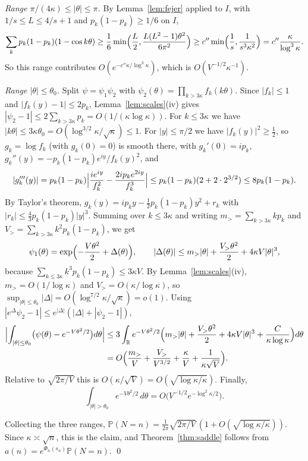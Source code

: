 \documentclass[11pt,a4paper]{article}
\theoremstyle{remark}
\begin{document}
\emph{Range $\pi/(4\kappa)\le|\theta|\le\pi$.} By Lemma~\ref{lem:fejer} applied to $I$, with $1/s\le L\le4/s+1$ and $p_k(1-p_k)\ge1/6$ on $I$,
\[
 \sum_kp_k(1-p_k)(1-\cos k\theta)\ge\frac16\min\Bigl(\frac L2,\frac{L(L^2-1)\theta^2}{6\pi^2}\Bigr)\ge c''\min\Bigl(\frac1s,\frac{1}{s^3\kappa^2}\Bigr)=c''\frac{\kappa}{\log^3\kappa}.
\]
So this range contributes $O(e^{-c''\kappa/\log^3\kappa})$, which is $O(V^{-1/2}\kappa^{-1})$.

\emph{Range $|\theta|\le\theta_0$.} Split $\psi=\psi_1\psi_2$ with $\psi_2(\theta)=\prod_{k>3\kappa}f_k(k\theta)$. Since $|f_k|\le1$ and $|f_k(y)-1|\le2p_k$, Lemma~\ref{lem:scales}(iv) gives $|\psi_2-1|\le2\sum_{k>3\kappa}p_k=O(1/(\kappa\log\kappa))$. For $k\le3\kappa$ we have $|k\theta|\le3\kappa\theta_0=O(\log^{3/2}\kappa/\sqrt\kappa)\le1$. For $|y|\le\pi/2$ we have $|f_k(y)|^2\ge\frac12$, so $g_k=\log f_k$ (with $g_k(0)=0$) is smooth there, with $g_k'(0)=ip_k$, $g_k''(y)=-p_k(1-p_k)e^{iy}/f_k(y)^2$, and
\[
 |g_k'''(y)|=p_k(1-p_k)\Bigl|\frac{ie^{iy}}{f_k^2}-\frac{2ip_ke^{2iy}}{f_k^3}\Bigr|\le p_k(1-p_k)(2+2\cdot2^{3/2})\le8p_k(1-p_k).
\]
By Taylor's theorem, $g_k(y)=ip_ky-\frac12p_k(1-p_k)y^2+r_k$ with $|r_k|\le\frac43p_k(1-p_k)|y|^3$. Summing over $k\le3\kappa$ and writing $m_>=\sum_{k>3\kappa}kp_k$ and $V_>=\sum_{k>3\kappa}k^2p_k(1-p_k)$, we get
\[
 \psi_1(\theta)=\exp\Bigl(-\frac{V\theta^2}2+\Delta(\theta)\Bigr),\qquad |\Delta(\theta)|\le m_>|\theta|+\frac{V_>\theta^2}2+4\kappa V|\theta|^3,
\]
because $\sum_{k\le3\kappa}k^3p_k(1-p_k)\le3\kappa V$. By Lemma~\ref{lem:scales}(iv), $m_>=O(1/\log\kappa)$ and $V_>=O(\kappa/\log\kappa)$, so $\sup_{|\theta|\le\theta_0}|\Delta|=O(\log^{7/2}\kappa/\sqrt\kappa)=o(1)$. Using $|e^{\Delta}\psi_2-1|\le e^{|\Delta|}(|\Delta|+|\psi_2-1|)$,
\begin{align*}
 \Bigl|\int_{|\theta|\le\theta_0}\bigl(\psi(\theta)-e^{-V\theta^2/2}\bigr)d\theta\Bigr|
 &\le3\int_{\mathbb R}e^{-V\theta^2/2}\Bigl(m_>|\theta|+\frac{V_>\theta^2}{2}+4\kappa V|\theta|^3+\frac{C}{\kappa\log\kappa}\Bigr)d\theta\\
 &=O\Bigl(\frac{m_>}{V}+\frac{V_>}{V^{3/2}}+\frac{\kappa}{V}+\frac{1}{\kappa\sqrt V}\Bigr).
\end{align*}
Relative to $\sqrt{2\pi/V}$ this is $O(\kappa/\sqrt V)=O(\sqrt{\log\kappa/\kappa})$. Finally,
\[
 \int_{|\theta|>\theta_0}e^{-V\theta^2/2}\,d\theta=O\bigl(V^{-1/2}e^{-\log^2\kappa/2}\bigr).
\]

Collecting the three ranges, $\mathbb P(N=n)=\frac1{2\pi}\sqrt{2\pi/V}\,(1+O(\sqrt{\log\kappa/\kappa}))$. Since $\kappa\asymp\sqrt n$, this is the claim, and Theorem~\ref{thm:saddle} follows from $a(n)=e^{\Phi_n(s_n)}\mathbb P(N=n)$. \qed
\end{document}
